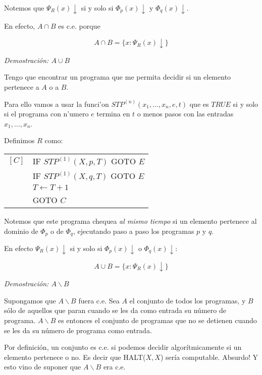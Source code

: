 \begin{questions}
\begin{solution}
  Notemos que $\Psi_R(x)\downarrow$ si y solo si $\Phi_p(x)\downarrow$ y $\Phi_q(x)\downarrow$. 

  En efecto, $A\cap B$ es c.e. porque

  \begin{equation*}
  A\cap B = \{ x : \Psi_R(x)\downarrow \}
  \end{equation*}

  {\it Demostraci\'on: $A\cup B$}

  Tengo que encontrar un programa que me permita decidir si un elemento pertenece a $A$ o a $B$. 

  Para ello vamos a usar la funci'on $STP^{(n)}(x_1, \dots, x_n, e, t)$ que es $TRUE$ si y solo si el programa con n'umero $e$ termina en $t$ o menos pasos con las entradas $x_1, \dots, x_n$. 

  Definimos $R$ como: 

  \vspace{0.5cm}
  \begin{tabular}{rl}
  $[C]$ & IF $STP^{(1)}(X, p, T)$ GOTO $E$ \\
      & IF $STP^{(1)}(X, q, T)$ GOTO $E$ \\
      & $T \leftarrow T + 1$ \\
      & GOTO $C$
  \end{tabular}
  \vspace{0.5cm}

  Notemos que este programa chequea \emph{al mismo tiempo} si un elemento pertenece al dominio de $\Phi_p$ o de $\Phi_q$, ejecutando paso a paso los programas $p$ y $q$. 

  En efecto $\Psi_R(x)\downarrow$ si y solo si $\Phi_p(x)\downarrow$ o $\Phi_q(x)\downarrow$: 

  \begin{equation*}
  A\cup B = \{ x : \Psi_R(x)\downarrow \}
  \end{equation*}

  {\it Demostraci\'on: $A\backslash B$}

  Supongamos que $A\backslash B$ fuera c.e. Sea $A$ el conjunto de todos los programas, y $B$ s\'olo de aquellos que paran cuando se les da como entrada su n\'umero de programa. $A\backslash B$ es entonces el conjunto de programas que no se detienen cuando se les da su n\'umero de programa como entrada. 
  
  Por definici\'on, un conjunto es c.e. si podemos decidir algor\'itmicamente si un elemento pertenece o no. Es decir que HALT($X,X$) ser\'ia computable. Absurdo! Y esto vino de suponer que $A\backslash B$ era c.e.
  

\end{solution}
\end{questions}

